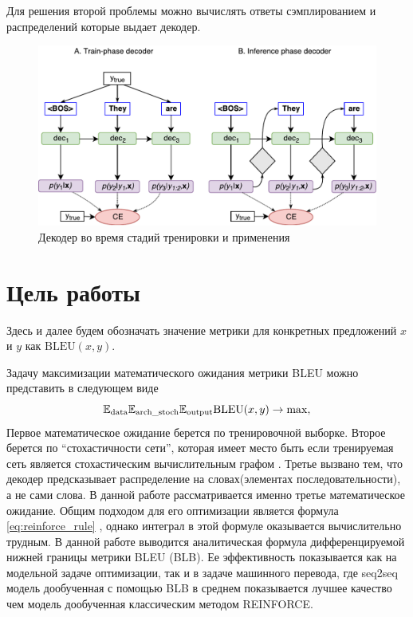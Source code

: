 \documentclass[14pt, a4paper]{extarticle}
\begin{document}
Для решения второй проблемы можно вычислять ответы сэмплированием и распределений которые выдает декодер.


\begin{figure}
\centering
\includegraphics[width=0.9\linewidth]{train_and_inference_decoder.pdf}
\caption{Декодер во время стадий тренировки и применения}
\label{fig:train_and_inference_decoder}
\end{figure}

\section{Цель работы}
Здесь и далее будем обозначать значение метрики для конкретных предложений $x$ и $y$ как $\textrm{BLEU}(x,y)$.

Задачу максимизации математического ожидания метрики BLEU можно представить в следующем виде
\begin{equation}
\mathbb{E}_{\mathrm{data}} \mathbb{E}_{\mathrm{arch\_stoch}} \mathbb{E}_{\mathrm{output}} \textnormal{BLEU}(x, y) \to \max, 
\label{BLEU_exp}
\end{equation}
Первое математическое ожидание берется по тренировочной выборке. Второе берется по ``стохастичности сети'', которая имеет место быть если тренируемая сеть является стохастическим вычислительным графом \cite{scg}. Третье вызвано тем, что декодер предсказывает распределение на словах(элементах последовательности), а не сами слова.
В данной работе рассматривается именно третье математическое ожидание. Общим подходом для его оптимизации является формула \ref{eq:reinforce_rule}
, однако интеграл в этой формуле оказывается вычислительно трудным.
В данной работе выводится аналитическая формула дифференцируемой нижней границы метрики BLEU (BLB). Ее эффективность показывается как на
модельной задаче оптимизации, так и в задаче машинного перевода, где seq2seq модель дообученная с помощью BLB в среднем показывается лучшее качество
чем модель дообученная классическим методом REINFORCE.
\end{document}
